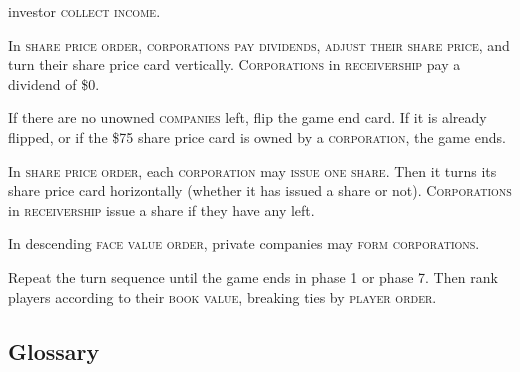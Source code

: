 \documentclass[11pt,a4paper]{article}
\newcounter{itemcounter}
\newenvironment{my_enumerate}
{\begin{list}{\arabic{itemcounter}.}
  {\usecounter{itemcounter}\leftmargin=1.8em}
  \setlength{\itemsep}{1pt}
  \setlength{\parskip}{0pt}
  \setlength{\parsep}{0pt}
}
{\end{list}}
\begin{document}
\begin{multicols}{2}
{\begin{my_enumerate}
{    investor} \textsc{collect income}.
\item In \textsc{share price order}, \textsc{corporations} \textsc{pay
    dividends}, \textsc{adjust their share price}, and turn their
  share price card vertically. \textsc{Corporations} in
  \textsc{receivership} pay a dividend of \$0.
\item If there are no unowned \textsc{companies} left, flip the game
  end card. If it is already flipped, or if the \$75 share price card
  is owned by a \textsc{corporation}, the game ends.
\item In \textsc{share price order}, each \textsc{corporation} may
  \textsc{issue one share}. Then it turns its share price card
  horizontally (whether it has issued a share or
  not). \textsc{Corporations} in \textsc{receivership} issue a share
  if they have any left.
\item In descending \textsc{face value order}, private companies may
  \textsc{form corporations}.
\end{my_enumerate}

Repeat the turn sequence until the game ends in phase 1 or phase
7. Then rank players according to their \textsc{book value},
breaking ties by \textsc{player order}.

\subsection*{Glossary}

}
\end{multicols}
\end{document}
